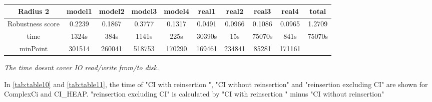 \documentclass{article}
\begin{document}
\begin{table}[]
\begin{adjustwidth}{-1cm}{}
\begin{threeparttable}
\begin{tabular}{|c|c|c|c|c|c|c|c|c|c|}
					\textbf{Radius 2} & \textbf{model1} & \textbf{model2} & \textbf{model3} & \textbf{model4} & \textbf{real1} & \textbf{real2} & \textbf{real3} & \textbf{real4} & \textbf{total} \\ \hline
					Robustness score                 & 0.2239          & 0.1867          & 0.3777          & 0.1317          & 0.0491         & 0.0966         & 0.1086         & 0.0965         & 1.2709         \\ \hline
					time                             & 1324s           & 384s            & 1141s           & 225s            & 30390s         & 15s            & 75070s         & 841s           & 75070s         \\ \hline
					minPoint                         & 301514          & 260041          & 518753          & 170290          & 169461         & 234841         & 85281          & 171161         &                \\ \hline				
				\end{tabular}
				\begin{tablenotes}
					\small
					\item\textit{ The time doesn\textquotesingle t cover IO read/write from/to disk.}
				\end{tablenotes}			
			\end{threeparttable}
		\end{adjustwidth}	
	\end{table}	



	In \ref{tab:table10} and \ref{tab:table11}, the time of "CI with reinsertion ", "CI without reinsertion" and "reinsertion excluding CI" are shown for ComplexCi and CI\_HEAP. "reinsertion excluding CI" is calculated by "CI with reinsertion " minus "CI without reinsertion"
\end{document}
